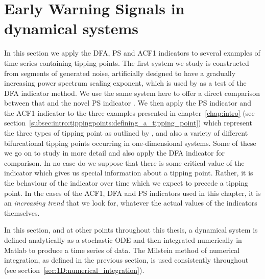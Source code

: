 {{	
}



\section{Early Warning Signals in dynamical systems}
\label{sec:1D:indicatorComparison}

{\Red In this section we apply the DFA, PS and ACF1 indicators to several  examples of time series containing tipping points. The first system we study is constructed from segments of generated noise, artificially designed to have a gradually increasing power spectrum scaling exponent, which is used by \cite{livina2012} as a test of the DFA indicator method. We use the same system here to offer a direct comparison between that and the novel PS indicator \citep{prettyman2018}. We then apply the PS indicator and the ACF1 indicator to the three examples presented in chapter~\ref{chap:intro} (see section~\ref{subsec:intro:tippingpoints:defining_a_tipping_point}) which represent the three types of tipping point as outlined by \cite{livina2011}, and also a variety of different bifurcational tipping points occurring in one-dimensional systems. Some of these we go on to study in more detail and also apply the DFA indicator for comparison. In no case do we suppose that there is some critical value of the indicator which gives us special information about a tipping point. Rather, it is the behaviour of the indicator over time which we expect to precede a tipping point. In the cases of the ACF1, DFA and PS indicators used in this chapter, it is an \emph{increasing trend} that we look for, whatever the actual values of the indicators themselves.
		
In this section, and at other points throughout this thesis, a dynamical system is defined analytically as a stochastic ODE and then integrated numerically in Matlab to produce a time series of data. The Milstein method of numerical integration, as defined in the previous section, is used consistently throughout (see section~\ref{sec:1D:numerical_integration}).
}

{}

}
